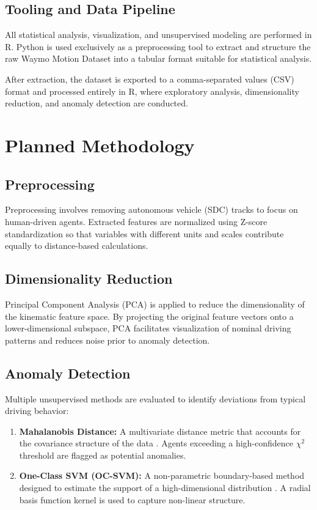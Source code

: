 \documentclass[conference]{IEEEtran}
\begin{document}
\subsection{Tooling and Data Pipeline}
All statistical analysis, visualization, and unsupervised modeling are performed in R. Python is used exclusively as a preprocessing tool to extract and structure the raw Waymo Motion Dataset into a tabular format suitable for statistical analysis.

After extraction, the dataset is exported to a comma-separated values (CSV) format and processed entirely in R, where exploratory analysis, dimensionality reduction, and anomaly detection are conducted.

\section{Planned Methodology}

\subsection{Preprocessing}
Preprocessing involves removing autonomous vehicle (SDC) tracks to focus on human-driven agents. Extracted features are normalized using Z-score standardization so that variables with different units and scales contribute equally to distance-based calculations.

\subsection{Dimensionality Reduction}
Principal Component Analysis (PCA) \cite{jolliffe2002principal} is applied to reduce the dimensionality of the kinematic feature space. By projecting the original feature vectors onto a lower-dimensional subspace, PCA facilitates visualization of nominal driving patterns and reduces noise prior to anomaly detection.

\subsection{Anomaly Detection}
Multiple unsupervised methods are evaluated to identify deviations from typical driving behavior:
\begin{enumerate}
    \item \textbf{Mahalanobis Distance:} A multivariate distance metric that accounts for the covariance structure of the data \cite{mahalanobis1936generalized}. Agents exceeding a high-confidence $\chi^2$ threshold are flagged as potential anomalies.
    \item \textbf{One-Class SVM (OC-SVM):} A non-parametric boundary-based method designed to estimate the support of a high-dimensional distribution \cite{scholkopf2001estimating}. A radial basis function kernel is used to capture non-linear structure.
\end{enumerate}
\end{document}
